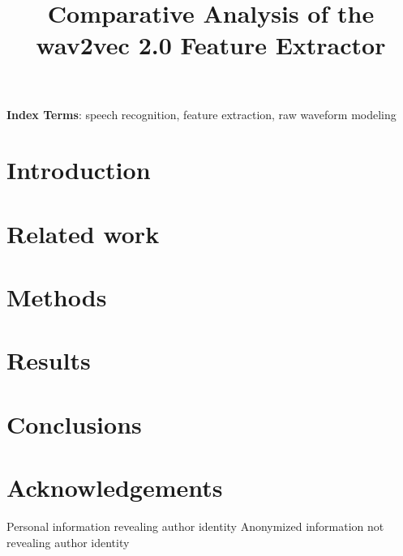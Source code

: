 \documentclass{INTERSPEECH2023}
\title{Comparative Analysis of the wav2vec 2.0 Feature Extractor}
\begin{document}
\maketitle
 
\begin{abstract}
\end{abstract}
\noindent\textbf{Index Terms}: speech recognition, feature extraction, raw waveform modeling


\section{Introduction}

\section{Related work}

\section{Methods}

\section{Results}

\section{Conclusions}

\section{Acknowledgements}

\ifinterspeechfinal
     Personal information revealing author identity
\else
     Anonymized information not revealing author identity
\fi



\end{document}
